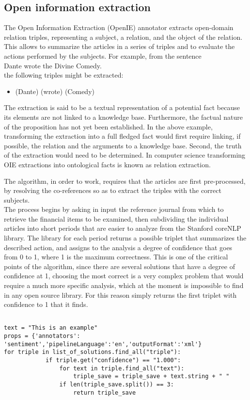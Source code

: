 \subsection{Open information extraction}
\par 
The Open Information Extraction (OpenIE) annotator extracts open-domain relation triples, representing a subject, a relation, and the object of the relation. This allows to summarize the articles in a series of triples and to evaluate the actions performed by the subjects. 
For example, from the sentence\\
Dante wrote the Divine Comedy.\\
the following triples might be extracted:
\begin{itemize}
\item
(Dante) (wrote) (Comedy)
\end{itemize}
The extraction is said to be a textual representation of a potential fact because its elements are not linked to a knowledge base. Furthermore, the factual nature of the proposition has not yet been established. In the above example, transforming the extraction into a full fledged fact would first require linking, if possible, the relation and the arguments to a knowledge base. Second, the truth of the extraction would need to be determined. In computer science transforming OIE extractions into ontological facts is known as relation extraction.
\par 
The algorithm, in order to work, requires that the articles are first pre-processed, by resolving the co-references so as to extract the triples with the correct subjects. \\
The process begins by asking in input the reference journal from which to retrieve the financial items to be examined, then subdividing the individual articles into short periods that are easier to analyze from the Stanford coreNLP library. The library for each period returns a possible triplet that summarizes the described action, and assigns to the analysis a degree of confidence that goes from 0 to 1, where 1 is the maximum correctness. This is one of the critical points of the algorithm, since there are several solutions that have a degree of confidence at 1, choosing the most correct is a very complex problem that would require a much more specific analysis, which at the moment is impossible to find in any open source library. For this reason simply returns the first triplet with confidence to 1 that it finds.
\begin{verbatim}
               
text = "This is an example"
props = {'annotators': 'sentiment','pipelineLanguage':'en','outputFormat':'xml'}
for triple in list_of_solutions.find_all("triple"):
            if triple.get("confidence") == "1.000":
                for text in triple.find_all("text"):
                    triple_save = triple_save + text.string + " "
                if len(triple_save.split()) == 3:
                    return triple_save
\end{verbatim}

